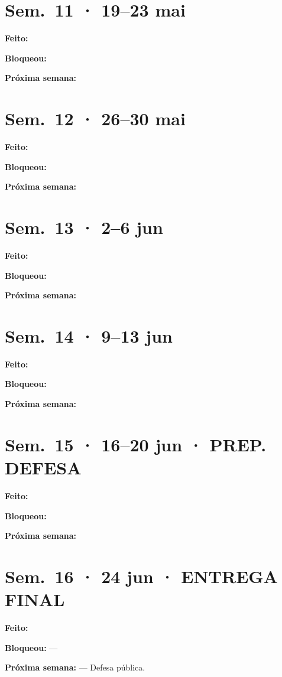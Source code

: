 \documentclass[a4paper,11pt]{article}
\newcommand{\semana}[2]{%
    \section{Sem.\ #1 · #2}%
}
\begin{document}
\semana{11}{19--23 mai}

\textbf{Feito:}

\textbf{Bloqueou:}

\textbf{Próxima semana:}

\semana{12}{26--30 mai}

\textbf{Feito:}

\textbf{Bloqueou:}

\textbf{Próxima semana:}

\semana{13}{2--6 jun}

\textbf{Feito:}

\textbf{Bloqueou:}

\textbf{Próxima semana:}

\semana{14}{9--13 jun}

\textbf{Feito:}

\textbf{Bloqueou:}

\textbf{Próxima semana:}

\semana{15}{16--20 jun · PREP. DEFESA}

\textbf{Feito:}

\textbf{Bloqueou:}

\textbf{Próxima semana:}

\semana{16}{24 jun · ENTREGA FINAL}

\textbf{Feito:}

\textbf{Bloqueou:} ---

\textbf{Próxima semana:} --- Defesa pública.
\end{document}
